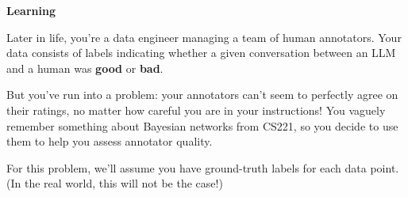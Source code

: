\item {\bf Learning}

Later in life, you're a data engineer managing a team of human annotators. Your data consists of labels indicating whether a given conversation between an LLM and a human was \textbf{good} or \textbf{bad}.

But you've run into a problem: your annotators can't seem to perfectly agree on their ratings, no matter how careful you are in your instructions! You vaguely remember something about Bayesian networks from CS221, so you decide to use them to help you assess annotator quality.

For this problem, we'll assume you have ground-truth labels for each data point. (In the real world, this will not be the case!)

\begin{enumerate}

  
  
  
  
  
  
  

\end{enumerate}
